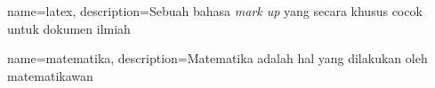{
    name=latex,
    description={Sebuah bahasa \textit{mark up} yang secara khusus cocok 
    untuk dokumen ilmiah}
}
 
{
    name=matematika,
    description={Matematika adalah hal yang dilakukan oleh matematikawan}
}